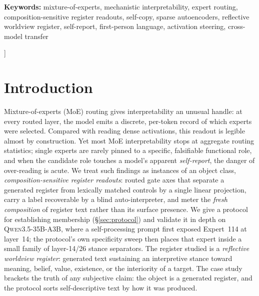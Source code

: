 \documentclass[10pt,a4paper,twocolumn]{article}
\begin{document}
\begin{@twocolumnfalse}
\begin{abstract}
largely intact), and index~114 is local to this model. The protocol brackets
the truth of any subjective claim: it sorts generated self-description by how
it was produced, and makes no claim about machine experience.
We release the prompts, preregistrations, analysis scripts, and
provenance under the MIT license.
\end{abstract}
\vspace{0.5em}
\noindent\textbf{Keywords:} mixture-of-experts, mechanistic interpretability,
expert routing, composition-sensitive register readouts, self-copy, sparse autoencoders, reflective worldview register, self-report,
first-person language, activation steering, cross-model transfer
\vspace{1.0em}
\end{@twocolumnfalse}
]

\section{Introduction}

Mixture-of-experts (MoE) routing gives interpretability an unusual handle: at
every routed layer, the model emits a discrete, per-token record of which experts
were selected. Compared with reading dense activations, this readout is legible
almost by construction. Yet most MoE interpretability stops at aggregate routing
statistics; single experts are rarely pinned to a specific, falsifiable
functional role, and when the candidate role touches a model's apparent
\emph{self-report}, the danger of over-reading is acute. We treat such findings as instances of an object class,
\emph{composition-sensitive register readouts}: routed gate axes that separate
a generated register from lexically matched controls by a single linear
projection, carry a label recoverable by a blind auto-interpreter, and meter
the \emph{fresh composition} of register text rather than its surface
presence. We give a protocol for establishing membership
(\S\ref{sec:protocol}) and validate it in depth on \textsc{Qwen3.5-35B-A3B},
where a self-processing prompt first exposed Expert~114 at layer~14; the
protocol's own specificity sweep then places that expert inside a small family
of layer-14/26 stance separators. The register studied is a \emph{reflective
worldview register}: generated text sustaining an interpretive stance toward
meaning, belief, value, existence, or the interiority of a target. The case
study brackets the truth of any subjective claim: the object is a generated
register, and the protocol sorts self-descriptive text by how it was produced.
\end{document}
